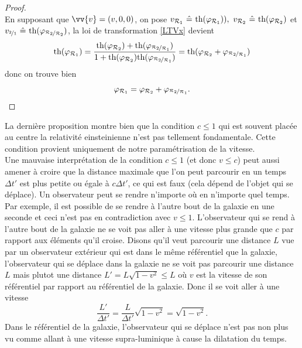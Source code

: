 \documentclass[a4paper,11pt]{report}
\begin{document}
            \begin{proof}
            ${}$\\
                En supposant que $\vv{v} = (v,0,0)$, on pose $v_{\mathcal{R}_1} ~\hat{=}~ \text{th}(\varphi_{\mathcal{R}_1})),~ v_{\mathcal{R}_2} ~\hat{=}~ \text{th}(\varphi_{\mathcal{R}_2})$ et $v_{\nicefrac{2}{1}} ~\hat{=}~ \text{th}(\varphi_{\nicefrac{\mathcal{R}_2}{\mathcal{R}_2}})$, la loi de transformation \ref{LTVx} devient
                \begin{equation}
                    \text{th}(\varphi_{\mathcal{R}_1}) = \frac{\text{th}(\varphi_{\mathcal{R}_2})+\text{th}(\varphi_{\nicefrac{\mathcal{R}_2}{\mathcal{R}_1}})}{1+\text{th}(\varphi_{\mathcal{R}_2})\text{th}(\varphi_{\nicefrac{\mathcal{R}_2}{\mathcal{R}_1}})} = \text{th}(\varphi_{\mathcal{R}_2}+\varphi_{\nicefrac{\mathcal{R}_2}{\mathcal{R}_1}})
                \end{equation}
                donc on trouve bien
                \begin{equation}
                    \varphi_{\mathcal{R}_1} = \varphi_{\mathcal{R}_2}+\varphi_{\nicefrac{\mathcal{R}_2}{\mathcal{R}_1}}.
                \end{equation}
            \end{proof}
            
            La dernière proposition montre bien que la condition $c\leq 1$ qui est souvent placée au centre la relativité einsteinienne n'est pas tellement fondamentale. Cette condition provient uniquement de notre paramétrisation de la vitesse.\\
            
            Une mauvaise interprétation de la condition $c\leq1$ (et donc $v\leq c$) peut aussi amener à croire que la distance maximale que l'on peut parcourir en un temps $\Delta t'$ est plus petite ou égale à $c\Delta t'$, ce qui est faux (cela dépend de l'objet qui se déplace). Un observateur peut se rendre n'importe où en n'importe quel temps. Par exemple, il est possible de se rendre à l'autre bout de la galaxie en une seconde et ceci n'est pas en contradiction avec $v\leq 1$. L'observateur qui se rend à l'autre bout de la galaxie ne se voit pas aller à une vitesse plus grande que $c$ par rapport aux éléments qu'il croise. Disons qu'il veut parcourir une distance $L$ vue par un observateur extérieur qui est dans le même référentiel que la galaxie, l'observateur qui se déplace dans la galaxie ne se voit pas parcourir une distance $L$ mais plutot une distance $L' = L\sqrt{1-v^2}\leq L$ où $v$ est la vitesse de son référentiel par rapport au référentiel de la galaxie. Donc il se voit aller à une vitesse
            \begin{equation}
                \frac{L'}{\Delta t'} = \frac{L}{\Delta t'} \sqrt{1-v^2} = \sqrt{1-v^2}.
            \end{equation}
            \comp
            Dans le référentiel de la galaxie, l'observateur qui se déplace n'est pas non plus vu comme allant à une vitesse supra-luminique à cause la dilatation du temps.\\
            
\end{document}
